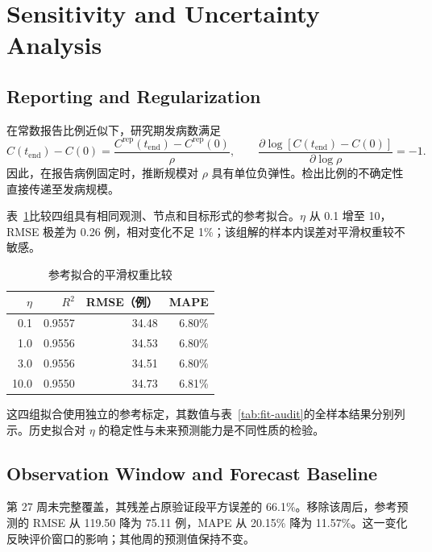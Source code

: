 \section{Sensitivity and Uncertainty Analysis}
\label{sec:sensitivity}

\subsection{Reporting and Regularization}

在常数报告比例近似下，研究期发病数满足
\begin{equation}
C(t_{\mathrm{end}})-C(0)
=\frac{C^{\mathrm{rep}}(t_{\mathrm{end}})-C^{\mathrm{rep}}(0)}{\rho},
\qquad
\frac{\partial\log[C(t_{\mathrm{end}})-C(0)]}{\partial\log\rho}=-1.
\label{eq:reporting-elasticity}
\end{equation}
因此，在报告病例固定时，推断规模对 $\rho$ 具有单位负弹性。检出比例的不确定性直接传递至发病规模。

表~\ref{tab:regularization}比较四组具有相同观测、节点和目标形式的参考拟合。$\eta$ 从 0.1 增至 10，RMSE 极差为 0.26 例，相对变化不足 1\%；该组解的样本内误差对平滑权重较不敏感。

\begin{table}[!htbp]
\centering
\caption{参考拟合的平滑权重比较}
\label{tab:regularization}
\begin{tabular}{@{}rrrr@{}}
\toprule
$\eta$ & $R^2$ & RMSE（例） & MAPE \\
\midrule
0.1 & 0.9557 & 34.48 & 6.80\% \\
1.0 & 0.9556 & 34.53 & 6.80\% \\
3.0 & 0.9556 & 34.51 & 6.80\% \\
10.0 & 0.9550 & 34.73 & 6.81\% \\
\bottomrule
\end{tabular}
\end{table}

这四组拟合使用独立的参考标定，其数值与表~\ref{tab:fit-audit}的全样本结果分别列示。历史拟合对 $\eta$ 的稳定性与未来预测能力是不同性质的检验。

\subsection{Observation Window and Forecast Baseline}

第 27 周未完整覆盖，其残差占原验证段平方误差的 66.1\%。移除该周后，参考预测的 RMSE 从 119.50 降为 75.11 例，MAPE 从 20.15\% 降为 11.57\%。这一变化反映评价窗口的影响；其他周的预测值保持不变。


